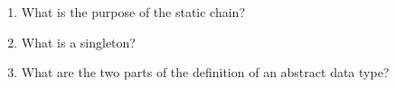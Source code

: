 \begin{enumerate}
  \item What is the purpose of the static chain?

  \begin{answer}
  \end{answer}

  \item What is a singleton?

  \begin{answer}
  \end{answer}

  \item What are the two parts of the definition 
    of an abstract data type?

  \begin{answer}
  \end{answer}

  \end{enumerate}



